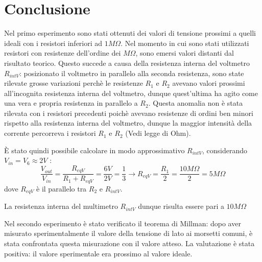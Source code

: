     \section{Conclusione}
    Nel primo esperimento sono stati ottenuti dei valori di tensione prossimi a quelli ideali con i resistori inferiori ad $1M\Omega$.
    Nel momento in cui sono stati utilizzati resistori con resistenze dell'ordine dei $M\Omega$, sono emersi valori distanti dal risultato teorico.
    Questo succede a causa della resistenza interna del voltmetro $R_{intV}$: posizionato il voltmetro in parallelo alla seconda resistenza, sono state rilevate grosse variazioni
    perchè le resistenze $R_1$ e $R_2$ avevano valori prossimi all'incognita resistenza interna del voltmetro, dunque quest'ultima ha agito come una vera e propria
    resistenza in parallelo a $R_2$. Questa anomalia non è stata rilevata con i resistori precedenti poichè avevano resistenze di ordini ben minori rispetto alla resistenza
    interna del voltmetro, dunque la maggior intensità della corrente percorreva i resistori $R_1$ e $R_2$ (Vedi legge di Ohm).\par
    È stato quindi possibile calcolare in modo approssimativo $R_{intV}$, considerando $V_{in} = V_6 \approx 2V$ :
    \begin{equation}
        \frac{V_{out}}{V_{in}} = \frac{R_{eqV}}{R_1 + R_{eqV}} = \frac{6V}{2V} = \frac{1}{3} \longrightarrow R_{eqV} = \frac{R_1}{2} = \frac{10M\Omega}{2} = 5M\Omega
    \end{equation}
    dove $R_{eqV}$ è il parallelo tra $R_2$ e $R_{intV}$.\par
    La resistenza interna del multimetro $R_{intV}$ dunque risulta essere pari a $10M\Omega$

    Nel secondo esperimento è stato verificato il teorema di Millman: dopo aver misurato sperimentalmente il valore della tensione di lato ai morsetti comuni,
    è stata confrontata questa misurazione con il valore atteso. La valutazione è stata positiva: il valore sperimentale era prossimo al valore ideale.

